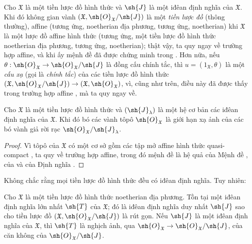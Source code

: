 \documentclass[oneside]{amsart}
\makeatletter
\newcommand{\ega@arrow}[2]{\mathchoice{#1}{#2}{#2}{#2}}
\renewcommand{\to}{\ega@arrow{\longrightarrow}{\rightarrow}}
\let\EGAOriginalLabel\label
\renewcommand{\label}[1]{\phantomsection\EGAOriginalLabel{#1}}
\makeatother
\begin{document}
\begin{env}[10.5.2]
\label{I.10.5.2}
Cho $\mathfrak{X}$ là một tiền lược đồ hình thức và $\sh{J}$ là một iđêan định nghĩa của $\mathfrak{X}$.
Khi đó không gian vành $(\mathfrak{X},\sh{O}_\mathfrak{X}/\sh{J})$ là một \emph{tiền lược đồ} (thông thường), affine (tương ứng, noetherian địa phương, tương ứng, noetherian) khi $\mathfrak{X}$ là một lược đồ affine hình thức (tương ứng, một tiền lược đồ hình thức noetherian địa phương, tương ứng, noetherian); thật vậy, ta quy ngay về trường hợp affine, và khi ấy mệnh đề đã được chứng minh trong .
Hơn nữa, nếu $\theta:\sh{O}_\mathfrak{X}\to\sh{O}_\mathfrak{X}/\sh{J}$ là đồng cấu chính tắc, thì $u=(1_\mathfrak{X},\theta)$ là một \emph{cấu xạ} (gọi là \emph{chính tắc}) của các tiền lược đồ hình thức $(\mathfrak{X},\sh{O}_\mathfrak{X}/\sh{J})\to(\mathfrak{X},\sh{O}_\mathfrak{X})$, vì, cũng như trên, điều này đã được thấy trong trường hợp affine , mà ta quy ngay về.
\end{env}

\begin{proposition}[10.5.3]
\label{I.10.5.3}
Cho $\mathfrak{X}$ là một tiền lược đồ hình thức và $(\sh{J}_\lambda)$ là một hệ cơ bản các iđêan định nghĩa của $\mathfrak{X}$.
Khi đó bó các vành tôpô $\sh{O}_\mathfrak{X}$ là giới hạn xạ ảnh của các bó vành giả rời rạc  $\sh{O}_\mathfrak{X}/\sh{J}_\lambda$.
\end{proposition}

\begin{proof}
Vì tôpô của $\mathfrak{X}$ có một cơ sở gồm các tập mở affine hình thức quasi-compact , ta quy về trường hợp affine, trong đó mệnh đề là hệ quả của Mệnh đề , của  và của Định nghĩa .
\end{proof}

Không chắc rằng mọi tiền lược đồ hình thức đều có iđêan định nghĩa.
Tuy nhiên:
\begin{proposition}[10.5.4]
\label{I.10.5.4}
Cho $\mathfrak{X}$ là một tiền lược đồ hình thức noetherian địa phương.
Tồn tại một iđêan định nghĩa lớn nhất $\sh{T}$ của $\mathfrak{X}$; đó là iđêan định nghĩa duy nhất $\sh{J}$ sao cho tiền lược đồ $(\mathfrak{X},\sh{O}_\mathfrak{X}/\sh{J})$ là rút gọn.
Nếu $\sh{J}$ là một iđêan định nghĩa của $\mathfrak{X}$, thì $\sh{T}$ là nghịch ảnh, qua $\sh{O}_\mathfrak{X}\to\sh{O}_\mathfrak{X}/\sh{J}$, của căn không của $\sh{O}_\mathfrak{X}/\sh{J}$.
\end{proposition}
\end{document}
